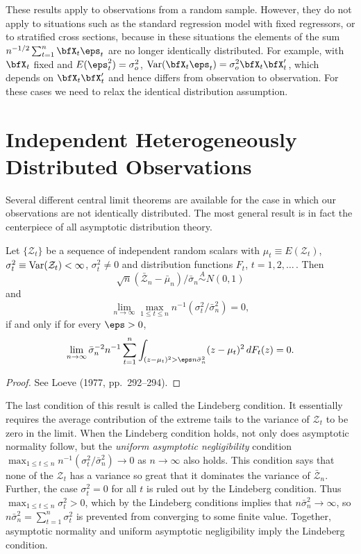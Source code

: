 These results apply to observations from a random sample. However, they do not apply to situations such as the standard regression model with fixed regressors, or to stratified cross sections, because in these situations the elements of the sum $n^{-1/2}\sum_{t=1}^{n}\bfX_t\eps_t$ are no longer identically distributed. For example, with $\bfX_t$ fixed and $E(\eps_t^2) = \sigma_o^2$, $\Var(\bfX_t\eps_t) = \sigma_o^2\bfX_t\bfX_t'$, which depends on $\bfX_t\bfX_t'$ and hence differs from observation to observation. For these cases we need to relax the identical distribution assumption.

\section{Independent Heterogeneously Distributed Observations}\label{sec:clt-ihd}

Several different central limit theorems are available for the case in which our observations are not identically distributed. The most general result is in fact the centerpiece of all asymptotic distribution theory.

\begin{theorem}\label{thm:lindeberg-feller}
Let $\{\mathcal{Z}_t\}$ be a sequence of independent random scalars with $\mu_t \equiv E(\mathcal{Z}_t)$, $\sigma_t^2 \equiv \operatorname{Var}(\mathcal{Z}_t) < \infty$, $\sigma_t^2 \neq 0$ and distribution functions $F_t$, $t = 1, 2, \ldots\,$. Then
\[
\sqrt{n}(\bar{\mathcal{Z}}_n - \bar{\mu}_n)/\bar{\sigma}_n \overset{A}{\sim} N(0,1)
\]
and
\[
\lim_{n \to \infty} \max_{1 \leq t \leq n} n^{-1}(\sigma_t^2/\bar{\sigma}_n^2) = 0,
\]
if and only if for every $\eps > 0$,
\[
\lim_{n \to \infty} \bar{\sigma}_n^{-2} n^{-1} \sum_{t=1}^{n} \int_{(z - \mu_t)^2 > \eps n \bar{\sigma}_n^2} (z - \mu_t)^2 \, dF_t(z) = 0.
\]
\end{theorem}

\begin{proof}
See Loeve (1977, pp.~292--294).
\end{proof}

The last condition of this result is called the Lindeberg condition. It essentially requires the average contribution of the extreme tails to the variance of $\mathcal{Z}_t$ to be zero in the limit. When the Lindeberg condition holds, not only does asymptotic normality follow, but the \textit{uniform asymptotic negligibility} condition $\max_{1 \leq t \leq n} n^{-1}(\sigma_t^2/\bar{\sigma}_n^2) \to 0$ as $n \to \infty$ also holds. This condition says that none of the $\mathcal{Z}_t$ has a variance so great that it dominates the variance of $\bar{\mathcal{Z}}_n$. Further, the case $\sigma_t^2 = 0$ for all $t$ is ruled out by the Lindeberg condition. Thus $\max_{1 \leq t \leq n} \sigma_t^2 > 0$, which by the Lindeberg conditions implies that $n\bar{\sigma}_n^2 \to \infty$, so $n\bar{\sigma}_n^2 = \sum_{t=1}^{n}\sigma_t^2$ is prevented from converging to some finite value. Together, asymptotic normality and uniform asymptotic negligibility imply the Lindeberg condition.

